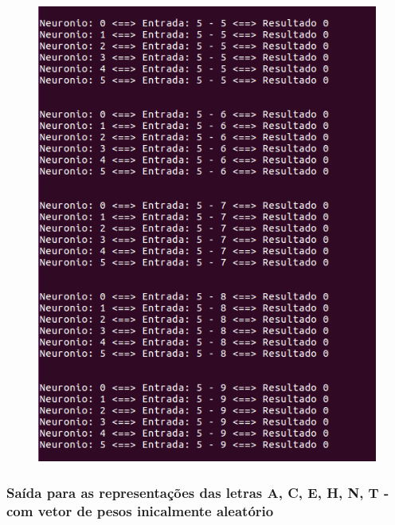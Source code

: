 \documentclass[hidelinks,12pt]{article}
\begin{document}
		\begin{figure}[!h]
			\centering
			\includegraphics[scale=0.5]{Figures/E3S5P2R.png}
		\end{figure}
		
		\newpage
		
		\subsubsection{Saída para as representações das letras A, C, E, H, N, T - com vetor de pesos inicalmente aleatório}
		
\end{document}
